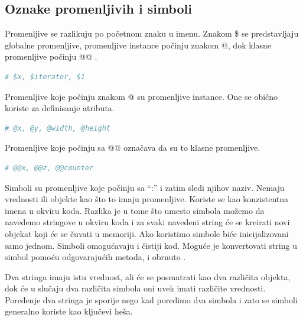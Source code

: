 \documentclass[a4paper]{article}
\begin{document}


\subsection{Oznake promenljivih i simboli}
Promenljive se razlikuju po početnom znaku u imenu. Znakom \$ se predstavljaju globalne promenljive, promenljive instance počinju znakom @, dok klasne promenljive počinju @@ \cite{poignant}.
\begin{lstlisting}[language=Ruby]
	# $x, $iterator, $1
\end{lstlisting}\vspace*{-15pt}
Promenljive koje počinju znakom @ su promenljive instance. One se obično koriste za definisanje atributa.
\begin{lstlisting}[language=Ruby]
	# @x, @y, @width, @height
\end{lstlisting}\vspace*{-15pt}
Promenljive koje počinju sa @@ označava da su to klasne promenljive.
\begin{lstlisting}[language=Ruby]
	# @@x, @@z, @@counter
\end{lstlisting}\vspace*{-20pt}

Simboli su promenljive koje počinju sa “:” i zatim sledi njihov naziv. Nemaju vrednosti ili objekte kao što to imaju promenljive. Koriste se kao konzistentna imena u okviru koda. Razlika je u tome što umesto simbola možemo da navedemo stringove u okviru koda i za svaki navedeni string će se kreirati novi objekat koji će se čuvati u memoriji. Ako koristimo simbole biće inicijalizovani samo jednom. Simboli omogućavaju i čistiji kod. Moguće je konvertovati string u simbol pomoću odgovarajućih metoda, i obrnuto \cite{fromNovice}.

Dva stringa imaju istu vrednost, ali će se posmatrati kao dva različita objekta, dok će u slučaju dva različita simbola oni uvek imati različite vrednosti. Poređenje dva stringa je sporije nego kad poredimo dva simbola i zato se simboli generalno koriste kao ključevi heša.

\end{document}
